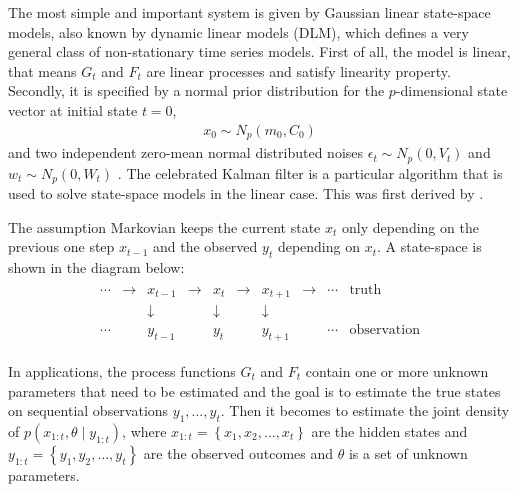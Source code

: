 The most simple and important system is given by Gaussian linear state-space models, also known by dynamic linear models (DLM), which defines a very general class of non-stationary time series models. First of all, the model is linear, that means $G_t$ and $F_t$ are linear processes and satisfy linearity property. Secondly, it is specified by a normal prior distribution for the $p$-dimensional state vector at initial state $t=0$, 
\begin{align*}
x_0 \sim N_p(m_0,C_0)
\end{align*} 
and two independent zero-mean normal distributed noises $\epsilon_t \sim N_p(0,V_t)$ and $w_t \sim N_p(0,W_t)$ \citep{petris2009dynamic}. The celebrated Kalman filter is a particular algorithm that is used to solve state-space models in the linear case. This was first derived by \cite{kalman1960new}.

The assumption Markovian keeps the current state $x_t$ only depending on the previous one step $x_{t-1}$ and the observed $y_t$ depending on $x_t$. A state-space is shown in the diagram below:
\begin{align*}
\begin{array}{cccccccccc}\cdots &\to &x_{t-1}&\to &x_{t}&\to &x_{t+1}&\to &\cdots &{\text{truth}}\\  &&\downarrow &&\downarrow &&\downarrow && &\\ \cdots&&y_{t-1}&&y_{t}&&y_{t+1}&&\cdots &{\text{observation}}\end{array}
\end{align*}

In applications, the process functions $G_t$ and $F_t$ contain one or more unknown parameters that need to be estimated \citep{de1988likelihood} and the goal is to estimate the true states on sequential observations $y_1, \ldots, y_t$. Then it becomes to estimate the joint density of $p(x_{1:t},\theta \mid y_{1:t})$, where $x_{1:t} = \left\lbrace x_1, x_2, \ldots, x_t \right\rbrace$ are the hidden states and $y_{1:t} = \left\lbrace y_1, y_2, \ldots, y_t \right\rbrace$ are the observed outcomes and $\theta$ is a set of unknown parameters. 


